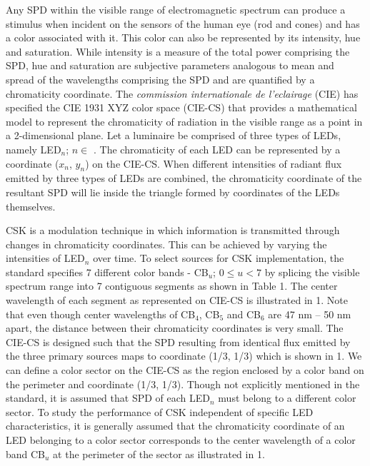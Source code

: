 \documentclass[10pt,letterpaper]{article}
\begin{document}
Any SPD within the visible range of
electromagnetic spectrum can produce a stimulus when incident on the
sensors of the human eye (rod and cones) and has a color associated with
it. This color can also be represented by its intensity, hue and
saturation. While intensity is a measure of the total power comprising
the SPD, hue and saturation are subjective parameters analogous to
mean and spread of the wavelengths comprising the SPD and are quantified
by a chromaticity coordinate. The \textit{commission internationale de
  l'eclairage} (CIE) has specified the CIE 1931 XYZ color space (CIE-CS)
that provides a mathematical model to represent the chromaticity of
radiation in the visible range as a point in a 2-dimensional
plane. 
Let a luminaire be comprised of three types of LEDs, namely LED$_{n}$; $n\in$ . The chromaticity of each LED can be
represented by a coordinate ($x_{n}$, $y_{n}$) on the CIE-CS. When
different intensities of radiant flux emitted by three types of LEDs
are combined, the chromaticity coordinate of the resultant SPD will
lie inside the triangle formed by coordinates of the LEDs themselves.

CSK is a modulation technique in which information is transmitted
through changes in chromaticity coordinates. This can be achieved by
varying the intensities of LED$_{n}$ over time. To select sources for CSK implementation, the
standard specifies 7 different color bands -
CB$_{u}$; $0\leq u < 7$ by splicing the visible spectrum range into 7 contiguous
segments as shown in Table 1. The center wavelength of each segment as represented 
on CIE-CS is illustrated in \figurename{ }1. Note that even though center wavelengths of CB$_{4}$, CB$_{5}$ and CB$_{6}$ are 47 nm -- 50 nm apart, the distance between their chromaticity coordinates is very small. The CIE-CS is designed such that the SPD resulting from identical flux emitted by the three primary sources maps to coordinate (1/3, 1/3) which is shown in \figurename{ }1. We can define a color sector on the CIE-CS as the region enclosed by a color band on the perimeter and coordinate (1/3, 1/3). Though not explicitly mentioned in the standard, it is assumed that SPD of
each LED$_{n}$ must belong to a different color sector. To study the performance of CSK independent of specific LED characteristics, it is generally assumed that the
chromaticity coordinate of an LED belonging to a color sector corresponds
to the center wavelength of a color band CB$_{u}$ at the perimeter of the sector as illustrated in \figurename{ }1.
\end{document}
